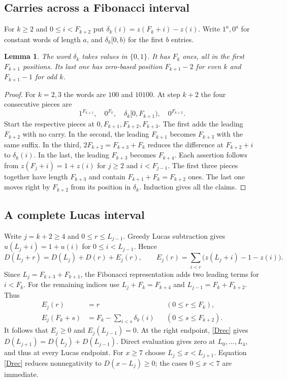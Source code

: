 \documentclass[10pt]{article}
\newtheorem{lemma}[theorem]{Lemma}
\begin{document}
\subsection*{Carries across a Fibonacci interval}
For $k\ge2$ and $0\le i<F_{k+2}$ put $\delta_k(i)=z(F_k+i)-z(i)$. Write $1^a,0^a$ for constant words of length $a$, and $\delta_k[0,b)$ for the first $b$ entries.
\begin{lemma}\label{carry}
The word $\delta_k$ takes values in $\{0,1\}$. It has $F_k$ ones, all in the first $F_{k+1}$ positions. Its last one has zero-based position $F_{k+1}-2$ for even $k$ and $F_{k+1}-1$ for odd $k$.
\end{lemma}
\begin{proof}
For $k=2,3$ the words are $100$ and $10100$. At step $k+2$ the four consecutive pieces are
\[
 1^{F_{k+1}},\quad 0^{F_k},\quad \delta_k[0,F_{k+1}),\quad 0^{F_{k+2}}.
\]
Start the respective pieces at $0,F_{k+1},F_{k+2},F_{k+3}$. The first adds the leading $F_{k+2}$ with no carry. In the second, the leading $F_{k+1}$ becomes $F_{k+3}$ with the same suffix. In the third, $2F_{k+2}=F_{k+3}+F_k$ reduces the difference at $F_{k+2}+i$ to $\delta_k(i)$. In the last, the leading $F_{k+3}$ becomes $F_{k+4}$. Each assertion follows from $z(F_j+i)=1+z(i)$ for $j\ge2$ and $i<F_{j-1}$. The first three pieces together have length $F_{k+3}$ and contain $F_{k+1}+F_k=F_{k+2}$ ones. The last one moves right by $F_{k+2}$ from its position in $\delta_k$. Induction gives all the claims.
\end{proof}

\subsection*{A complete Lucas interval}
Write $j=k+2\ge4$ and $0\le r\le L_{j-1}$. Greedy Lucas subtraction gives $u(L_j+i)=1+u(i)$ for $0\le i<L_{j-1}$. Hence
\begin{equation}\label{Drec}
 D(L_j+r)=D(L_j)+D(r)+E_j(r),\qquad
 E_j(r)=\sum_{i<r}\bigl(z(L_j+i)-1-z(i)\bigr).
\end{equation}
Since $L_j=F_{k+3}+F_{k+1}$, the Fibonacci representation adds two leading terms for $i<F_k$. For the remaining indices use $L_j+F_k=F_{k+4}$ and $L_{j-1}=F_k+F_{k+2}$. Thus
\begin{align}
 E_j(r)&=r &&(0\le r\le F_k),\nonumber\\
 E_j(F_k+s)&=F_k-\sum_{i<s}\delta_k(i) &&(0\le s\le F_{k+2}).\label{E}
\end{align}
It follows that $E_j\ge0$ and $E_j(L_{j-1})=0$. At the right endpoint, \eqref{Drec} gives $D(L_{j+1})=D(L_j)+D(L_{j-1})$. Direct evaluation gives zero at $L_0,\ldots,L_4$, and thus at every Lucas endpoint. For $x\ge7$ choose $L_j\le x<L_{j+1}$. Equation \eqref{Drec} reduces nonnegativity to $D(x-L_j)\ge0$; the cases $0\le x<7$ are immediate.
\end{document}
